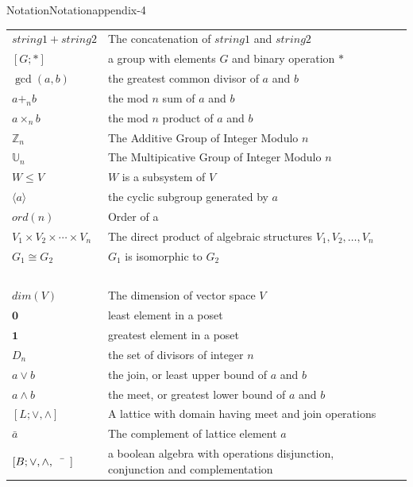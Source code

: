 \documentclass[twoside,10pt,]{book}
\numberwithin{equation}{section}
\begin{document}
\begin{appendixptx}{Notation}{}{Notation}{}{}{appendix-4}
\begin{longtable}[l]{lp{}r}
\(string1 + string2\)&The concatenation of \(string1\) and \(string2\)&\pageref{notation-64}\\
\([G;*]\)&a group with elements \(G\) and binary operation \(*\)&\pageref{notation-65}\\
\(\gcd(a,b)\)&the greatest common divisor of \(a\) and \(b\)&\pageref{notation-66}\\
\(a +_n b\)&the mod \(n\) sum of \(a\) and \(b\)&\pageref{notation-67}\\
\(a \times_n b\)&the mod \(n\) product of \(a\) and \(b\)&\pageref{notation-68}\\
\(\mathbb{Z}_n\)&The Additive Group of Integer Modulo \(n\)&\pageref{notation-69}\\
\(\mathbb{U}_n\)&The Multipicative Group of Integer Modulo \(n\)&\pageref{notation-70}\\
\(W \leq  V\)&\(W\) is a subsystem of \(V\)&\pageref{notation-71}\\
\(\langle a \rangle\)&the cyclic subgroup generated by \(a\)&\pageref{notation-72}\\
\(ord(n)\)&Order of a&\pageref{notation-73}\\
\(V_1\times V_2 \times \cdots \times V_n\)&The direct product of algebraic structures \(V_1,  V_2, \dots , V_n \)&\pageref{notation-74}\\
\(G_1 \cong G_2\)&\(G_1\) is isomorphic to \(G_2\)&\pageref{notation-75}\\
\(\)&&\pageref{notation-76}\\
\(dim(V)\)&The dimension of vector space \(V\)&\pageref{notation-77}\\
\(\pmb{0}\)&least element in a poset&\pageref{notation-78}\\
\(\pmb{1}\)&greatest element in a poset&\pageref{notation-79}\\
\(D_n\)&the set of divisors of integer \(n\)&\pageref{notation-80}\\
\(a \lor b\)&the join, or least upper bound of \(a\) and \(b\)&\pageref{notation-81}\\
\(a \land b\)&the meet, or greatest lower bound of \(a\) and \(b\)&\pageref{notation-82}\\
\([L;\lor,\land]\)&A lattice with domain having meet and join operations&\pageref{notation-83}\\
\(\bar{a}\)&The complement of lattice element \(a\)&\pageref{notation-84}\\
\([B;  \lor , \land, \bar{\hspace{5 mm}}]\)&a boolean algebra with operations disjunction, conjunction and complementation&\pageref{notation-85}\\

\end{longtable}
\end{appendixptx}
\end{document}
